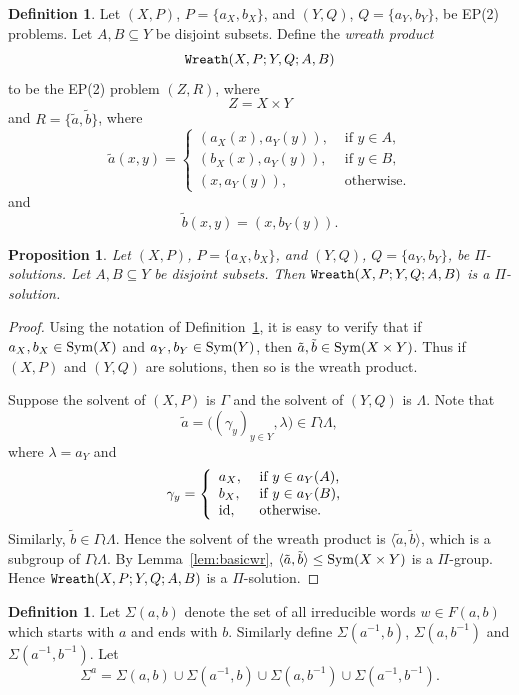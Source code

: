 \documentclass[11pt]{amsart}
\newtheorem{proposition}[theorem]{Proposition}
\theoremstyle{definition}
\newtheorem{definition}[theorem]{Definition}
\theoremstyle{definition}
\numberwithin{equation}{section}
\begin{document}
\begin{definition}\label{def:wreath} Let $(X, P)$, $P=\{a_X,b_X\}$, and $(Y, Q)$, $Q=\{a_Y, b_Y\}$, be EP(2) problems. Let $A, B\subseteq Y$ be disjoint subsets. Define the {\em wreath product} $$\mbox{\tt Wreath}(X, P; Y, Q; A, B)$$ to be the EP(2) problem $(Z, R)$, where
$$ Z= X\times Y $$
and
$R=\{\tilde{a}, \tilde{b}\}$, where
$$ \tilde{a}(x, y)=\left\{\begin{array}{ll} (a_X(x), a_Y(y)), & \mbox{ if $y\in A$, } \\ (b_X(x), a_Y(y)), & \mbox{ if $y\in B$,} \\ (x, a_Y(y)), & \mbox{ otherwise.} \end{array}\right. $$
and
$$ \tilde{b}(x,y)=(x, b_Y(y)). $$
\end{definition}

\begin{proposition}\label{prop:wrps} Let $(X, P)$, $P=\{a_X, b_X\}$, and $(Y, Q)$, $Q=\{a_Y, b_Y\}$, be $\Pi$-solutions. Let $A, B\subseteq Y$ be disjoint subsets. Then $\mbox{\tt Wreath}(X, P; Y, Q; A, B)$ is a $\Pi$-solution.
\end{proposition}

\begin{proof} Using the notation of Definition~\ref{def:wreath}, it is easy to verify that if $a_X, b_X\in \mbox{\rm Sym}(X)$ and $a_Y, b_Y\in \mbox{\rm Sym}(Y)$, then $\tilde{a}, \tilde{b}\in \mbox{\rm Sym}(X\times Y)$. Thus if $(X, P)$ and $(Y, Q)$ are solutions, then so is the wreath product. 

Suppose the solvent of $(X, P)$ is $\Gamma$ and the solvent of $(Y, Q)$ is $\Lambda$. Note that
$$ \tilde{a}=\big((\gamma_y)_{y\in Y}, \lambda\big)\in \Gamma\wr\Lambda, $$
where $\lambda=a_Y$ and 
$$ \gamma_y=\left\{\begin{array}{ll} a_X, & \mbox{ if $y\in a_Y(A)$, } \\ b_X, & \mbox{ if $y\in a_Y(B)$,} \\ \mbox{\rm id}, & \mbox{ otherwise.} \end{array}\right. $$
Similarly, $\tilde{b}\in \Gamma\wr\Lambda$. Hence the solvent of the wreath product is $\langle \tilde{a}, \tilde{b}\rangle$, which is a subgroup of $\Gamma\wr\Lambda$. By Lemma~\ref{lem:basicwr}, $\langle \tilde{a}, \tilde{b}\rangle\leq \mbox{\rm Sym}(X\times Y)$ is a $\Pi$-group. Hence $\mbox{\tt Wreath}(X, P; Y, Q; A, B)$ is a $\Pi$-solution.
\end{proof}


\begin{definition} Let $\Sigma(a, b)$ denote the set of all irreducible words $w\in F(a, b)$ which starts with $a$ and ends with $b$. Similarly define $\Sigma(a^{-1}, b)$, $\Sigma(a, b^{-1})$ and $\Sigma(a^{-1}, b^{-1})$. Let 
$$ \Sigma^a=\Sigma(a, b)\cup \Sigma(a^{-1}, b)\cup \Sigma(a, b^{-1})\cup \Sigma(a^{-1}, b^{-1}). $$
\end{definition}
\end{document}

